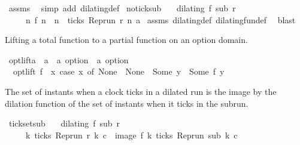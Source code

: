 \begin{isabellebody}
%
\isadelimproof
%
\endisadelimproof
%
\isatagproof
{}\isamarkupfalse%
\ assms\ \isamarkupfalse%
\ {\isacharparenleft}simp\ add{\isacharcolon}\ dilating{\isacharunderscore}def{\isacharparenright}%
\endisatagproof
{\isafoldproof}%
%
\isadelimproof
\isanewline
%
\endisadelimproof
\isanewline
{}\isamarkupfalse%
\ no{\isacharunderscore}tick{\isacharunderscore}sub{\isacharcolon}\isanewline
\ \ \ {\isacartoucheopen}dilating\ f\ sub\ r{\isacartoucheclose}\isanewline
\ \ \ \ \ {\isacartoucheopen}{\isacharparenleft}{\isasymnexists}n\ f\ n\ {\isacharequal}\ n{\isacharparenright}\ {\isasymlongrightarrow}\ {\isasymnot}ticks\ {\isacharparenleft}{\isacharparenleft}Rep{\isacharunderscore}run\ r{\isacharparenright}\ n\ a{\isacharparenright}{\isacartoucheclose}\isanewline
%
\isadelimproof
%
\endisadelimproof
%
\isatagproof
{}\isamarkupfalse%
\ assms\ dilating{\isacharunderscore}def\ dilating{\isacharunderscore}fun{\isacharunderscore}def\ \isamarkupfalse%
\ blast%
\endisatagproof
{\isafoldproof}%
%
\isadelimproof
%
\endisadelimproof
%
\begin{isamarkuptext}%
Lifting a total function to a partial function on an option domain.%
\end{isamarkuptext}\isamarkuptrue%
\isamarkupfalse%
\ opt{\isacharunderscore}lift{\isacharcolon}{\isacharcolon}{\isacartoucheopen}{\isacharparenleft}{\isacharprime}a\ {\isasymRightarrow}\ {\isacharprime}a{\isacharparenright}\ {\isasymRightarrow}\ {\isacharparenleft}{\isacharprime}a\ option\ {\isasymRightarrow}\ {\isacharprime}a\ option{\isacharparenright}{\isacartoucheclose}\isanewline
{}\isanewline
\ \ {\isacartoucheopen}opt{\isacharunderscore}lift\ f\ {\isasymequiv}\ {\isasymlambda}x{\isachardot}\ case\ x\ of\ None\ {\isasymRightarrow}\ None\ {\isacharbar}\ Some\ y\ {\isasymRightarrow}\ Some\ {\isacharparenleft}f\ y{\isacharparenright}{\isacartoucheclose}%
\begin{isamarkuptext}%
The set of instants when a clock ticks in a dilated run is the image by the 
  dilation function of the set of instants when it ticks in the subrun.%
\end{isamarkuptext}\isamarkuptrue%
\isamarkupfalse%
\ tick{\isacharunderscore}set{\isacharunderscore}sub{\isacharcolon}\isanewline
\ \ \ {\isacartoucheopen}dilating\ f\ sub\ r{\isacartoucheclose}\isanewline
\ \ \ \ \ {\isacartoucheopen}{\isacharbraceleft}k{\isachardot}\ ticks\ {\isacharparenleft}{\isacharparenleft}Rep{\isacharunderscore}run\ r{\isacharparenright}\ k\ c{\isacharparenright}{\isacharbraceright}\ {\isacharequal}\ image\ f\ {\isacharbraceleft}k{\isachardot}\ ticks\ {\isacharparenleft}{\isacharparenleft}Rep{\isacharunderscore}run\ sub{\isacharparenright}\ k\ c{\isacharparenright}{\isacharbraceright}{\isacartoucheclose}\isanewline

\end{isabellebody}
